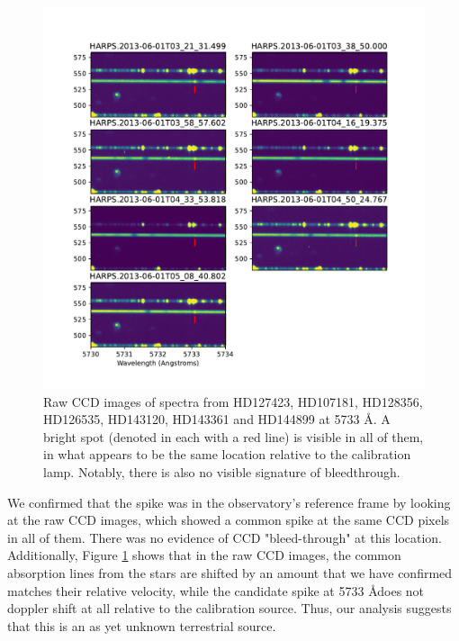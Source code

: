 \documentclass[linenumbers]{aastex631}
\begin{document}
\begin{figure}
    \centering
    \includegraphics[width=\textwidth]{rawccdmultiplestars2.pdf}    \caption{Raw CCD images of spectra from HD127423, HD107181, HD128356, HD126535, HD143120, HD143361 and HD144899 at 5733 \AA. A bright spot (denoted in each with a red line) is visible in all of them, in what appears to be the same location relative to the calibration lamp. Notably, there is also no visible signature of bleedthrough.}
    \label{fig:rawccdrecurrences}
\end{figure}

 We confirmed that the spike was in the observatory's reference frame by looking at the raw CCD images, which showed a common spike at the same CCD pixels in all of them.  There was no evidence of CCD "bleed-through" at this location. Additionally, Figure \ref{fig:rawccdrecurrences} shows that in the raw CCD images, the common absorption lines from the stars are shifted by an amount that we have confirmed matches their relative velocity, while the candidate spike at 5733 \AA does not doppler shift at all relative to the calibration source. Thus, our analysis suggests that this is an as yet unknown terrestrial source.
\end{document}
